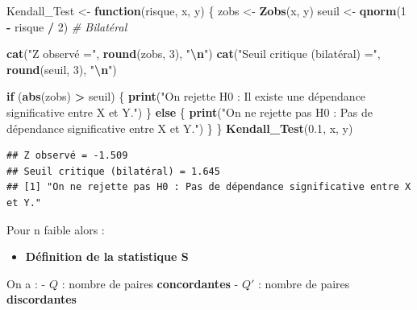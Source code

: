 \documentclass[
  12pt,
]{article}
\newenvironment{Shaded}{\begin{snugshade}}{\end{snugshade}}
\newcommand{\CommentTok}[1]{\textcolor[rgb]{0.56,0.35,0.01}{\textit{#1}}}
\newcommand{\ControlFlowTok}[1]{\textcolor[rgb]{0.13,0.29,0.53}{\textbf{#1}}}
\newcommand{\DecValTok}[1]{\textcolor[rgb]{0.00,0.00,0.81}{#1}}
\newcommand{\FloatTok}[1]{\textcolor[rgb]{0.00,0.00,0.81}{#1}}
\newcommand{\FunctionTok}[1]{\textcolor[rgb]{0.13,0.29,0.53}{\textbf{#1}}}
\newcommand{\NormalTok}[1]{#1}
\newcommand{\OtherTok}[1]{\textcolor[rgb]{0.56,0.35,0.01}{#1}}
\newcommand{\SpecialCharTok}[1]{\textcolor[rgb]{0.81,0.36,0.00}{\textbf{#1}}}
\newcommand{\StringTok}[1]{\textcolor[rgb]{0.31,0.60,0.02}{#1}}
\providecommand{\tightlist}{%
  \setlength{\itemsep}{0pt}\setlength{\parskip}{0pt}}
\begin{document}
\begin{Shaded}
\begin{Highlighting}[]
\NormalTok{Kendall\_Test }\OtherTok{\textless{}{-}} \ControlFlowTok{function}\NormalTok{(risque, x, y) \{}
\NormalTok{  zobs }\OtherTok{\textless{}{-}} \FunctionTok{Zobs}\NormalTok{(x, y)}
\NormalTok{  seuil }\OtherTok{\textless{}{-}} \FunctionTok{qnorm}\NormalTok{(}\DecValTok{1} \SpecialCharTok{{-}}\NormalTok{ risque }\SpecialCharTok{/} \DecValTok{2}\NormalTok{)  }\CommentTok{\# Bilatéral}

  \FunctionTok{cat}\NormalTok{(}\StringTok{"Z observé ="}\NormalTok{, }\FunctionTok{round}\NormalTok{(zobs, }\DecValTok{3}\NormalTok{), }\StringTok{"}\SpecialCharTok{\textbackslash{}n}\StringTok{"}\NormalTok{)}
  \FunctionTok{cat}\NormalTok{(}\StringTok{"Seuil critique (bilatéral) ="}\NormalTok{, }\FunctionTok{round}\NormalTok{(seuil, }\DecValTok{3}\NormalTok{), }\StringTok{"}\SpecialCharTok{\textbackslash{}n}\StringTok{"}\NormalTok{)}
  
  \ControlFlowTok{if}\NormalTok{ (}\FunctionTok{abs}\NormalTok{(zobs) }\SpecialCharTok{\textgreater{}}\NormalTok{ seuil) \{}
    \FunctionTok{print}\NormalTok{(}\StringTok{"On rejette H0 : Il existe une dépendance significative entre X et Y."}\NormalTok{)}
\NormalTok{  \} }\ControlFlowTok{else}\NormalTok{ \{}
    \FunctionTok{print}\NormalTok{(}\StringTok{"On ne rejette pas H0 : Pas de dépendance significative entre X et Y."}\NormalTok{)}
\NormalTok{  \}}
\NormalTok{\}}
\FunctionTok{Kendall\_Test}\NormalTok{(}\FloatTok{0.1}\NormalTok{, x, y)}
\end{Highlighting}
\end{Shaded}

\begin{verbatim}
## Z observé = -1.509 
## Seuil critique (bilatéral) = 1.645 
## [1] "On ne rejette pas H0 : Pas de dépendance significative entre X et Y."
\end{verbatim}

Pour n faible alors :

\begin{itemize}
\tightlist
\item
  \textbf{Définition de la statistique S}
\end{itemize}

On a : - \(Q\) : nombre de paires \textbf{concordantes} - \(Q'\) :
nombre de paires \textbf{discordantes}
\end{document}
